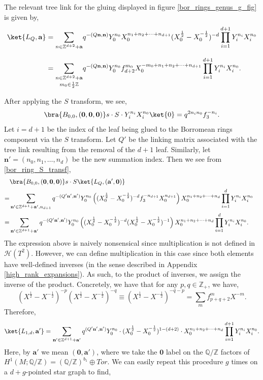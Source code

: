 \documentclass{article}
\newcommand{\Z}{{\mathbb Z}}
\newcommand{\Q}{{\mathbb Q}}
\def\be{\begin{equation}}
\def\ee{\end{equation}}
\numberwithin{corollary}{theorem}
\numberwithin{corollary}{proposition}
\begin{document}
The relevant tree link for the gluing displayed in figure \ref{bor_rings_genus_g_fig} is given by,
\begin{align*}
\ket{L_Q,\mathbf{a}} & = \underset{}{\sum_{n\in \Z^{d+2} + \mathbf{a}}} q^{-(Q\mathbf{n},\mathbf{n})} Y^{n_0}_0X_0^{n_1+n_2+\cdots+n_{d+1}}(X^{\frac{1}{2}}_0-X^{-\frac{1}{2}}_0)^{-d}\prod^{d+1}_{i=1}Y_i^{n_i}X^{n_0}_i\\
&=\underset{m_0\in \frac{1}{2}\Z}{\sum_{n\in \Z^{d+2} + \mathbf{a}}} q^{-(Q\mathbf{n},\mathbf{n})} Y^{n_0}_0 f^{m_0}_{d+2} X_0^{-m_0+n_1+n_2+\cdots+n_{d+1}} \prod^{d+1}_{i=1}Y_i^{n_i}X^{n_0}_i .
\end{align*}

After applying the $S$ transform, we see,
\be
\label{bor_ring_S_transf} \bra{B_{0,0},(\mathbf{0},\mathbf{0},\mathbf{0})}s \cdot S \cdot Y_i^{n_i}X_i^{n_0}\ket{0} = q^{2n_i n_0}f^{-n_i}_{3}. 
\ee
Let $i=d+1$ be the index of the leaf being glued to the Borromean rings component via the $S$ transform. Let $Q'$ be the linking matrix associated with the tree link resulting from the removal of the $d+1$ leaf. Similarly, let $\mathbf{n'} = (n_0,n_1,\ldots,n_d)$ be the new summation index. Then we see from \eqref{bor_ring_S_transf},
\begin{align*}
  & \bra{B_{0,0},(\mathbf{0},\mathbf{0},\mathbf{0})}s\cdot S\ket{L_Q,(\mathbf{a}',\mathbf{0})}   \endline
   = & \sum_{\mathbf{n'}\in \Z^{d+1}+\mathbf{a'},n_{d+1}} q^{-(Q'\mathbf{n'},\mathbf{n'})} Y^{n_0}_0 \left((X^{\frac{1}{2}}_0-X^{-\frac{1}{2}}_0)^{-d} f^{-n_{d+1}}_{3} X_0^{n_{d+1}}\right) X_0^{n_1+n_2+\cdots+n_d} \prod^{d}_{i=1}Y_i^{n_i}X^{n_0}_i \endline
   = & \sum_{\mathbf{n'}\in \Z^{d+1}+\mathbf{a'}} q^{-(Q'\mathbf{n'},\mathbf{n'})} Y^{n_0}_0 \left((X^{\frac{1}{2}}_0-X^{-\frac{1}{2}}_0)^{-d} (X^{\frac{1}{2}}_0-X^{-\frac{1}{2}}_0)^{-1}\right) X_0^{n_1+n_2+\cdots+n_d} \prod^{d}_{i=1}Y_i^{n_i}X^{n_0}_i.
\end{align*}
The expression above is naively nonsensical since multiplication is not defined in $\mathcal{H}(T^2)$. However, we can define multiplication in this case since both elements have well-defined inverses (in the sense described in Appendix \ref{high_rank_expansions}). As such, to the product of inverses, we assign the inverse of the product.  Concretely, we have that for any $p,q\in\mathbb{Z_+}$, we have,
$$(X^{\frac{1}{2}}-X^{-\frac{1}{2}})^{-p}(X^{\frac{1}{2}}-X^{-\frac{1}{2}})^{-q} \equiv  (X^{\frac{1}{2}}-X^{-\frac{1}{2}})^{-q-p} = \sum_{m} f^{m}_{p+q+2}X^{-m}.$$
Therefore,
$$\ket{L_{1,d},\mathbf{a}'} = \sum_{\mathbf{n'}\in \Z^{d+1}+\mathbf{a}'} q^{(Q'\mathbf{n'},\mathbf{n'})} Y^{n_0}_0 \cdot (X^{\frac{1}{2}}_0-X^{-\frac{1}{2}}_0)^{1-(d+2)}  \cdot X_0^{n_1+n_2+\cdots+n_d} \prod^{d+1}_{i=1}Y_i^{n_i}X^{n_0}_i.$$
Here, by $\mathbf{a}'$ we mean $(\mathbf{0},\mathbf{a}')$, where we take the $\mathbf{0}$ label on the $\Q/\Z$ factors of $H^1(M;\Q/\Z) = (\Q/\Z)^{b_1} \oplus Tor$. We can easily repeat this procedure $g$ times on a $ d+g$-pointed star graph to find,
\end{document}
